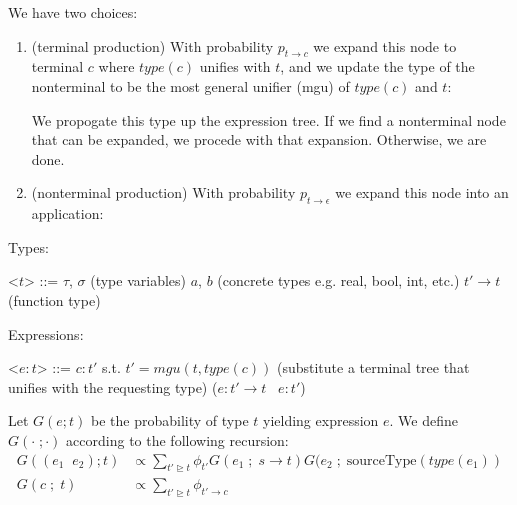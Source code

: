 \documentclass{article}
\newcommand{\funtype}[2]{#1 \rightarrow #2}
\newcommand{\typedexp}[2]{#1 : #2}
\newcommand{\type}[1]{type(#1)}
\begin{document}
We have two choices: 
\begin{enumerate}
\item (terminal production) With probability $p_{t \rightarrow c}$ we
  expand this node to terminal $c$ where $\type{c}$ unifies with $t$,
  and we update the type of the nonterminal to be the most general
  unifier (mgu) of $\type{c}$ and $t$:


We propogate this type up the expression tree. If we find a
nonterminal node that can be expanded, we procede with that
expansion. Otherwise, we are done.

\item (nonterminal production) With probability $p_{t \rightarrow
  \epsilon}$ we expand this node into an application:

\end{enumerate}


Types:
\begin{grammar}
<$t$> ::= $\tau$, $\sigma$  (type variables)
  \alt $a$, $b$ (concrete types e.g. real, bool, int, etc.)
  \alt $\funtype{t'}{t}$ (function type)
\end{grammar}

Expressions: 
\begin{grammar}
<$\typedexp{e}{t}$> ::= $\typedexp{c}{t'}$ s.t. $t' = mgu(t,
\type{c})$ (substitute a terminal tree that unifies with the requesting type)
  \alt ($\typedexp{e}{\funtype{t'}{t}} \;\;\; \typedexp{e}{t'}$)
\end{grammar}

Let $G(e ; t)$ be the probability of type $t$ yielding expression
$e$. We define $G(\cdot \; ; \cdot)$ according to the following recursion:
\begin{align}
G( (e_1 \;\; e_2 ); t) &\propto \sum_{t' \trianglerighteq t} \phi_{t'} G(e_1 \; ; \; \funtype{s}{t})
   G(e_2 \; ; \;  \text{sourceType}(\type{e_1})\\
G( c \; ; \; t) &\propto \sum_{t' \trianglerighteq t} \phi_{\funtype{t'}{c}}
\end{align}
\end{document}
